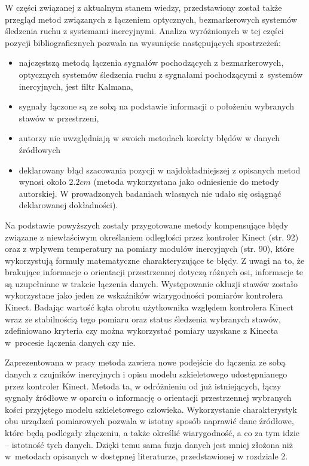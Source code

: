 \documentclass[10pt,a4paper]{article}
\begin{document}
W części związanej z aktualnym stanem wiedzy, przedstawiony został także przegląd metod związanych z łączeniem optycznych, bezmarkerowych systemów śledzenia ruchu z systemami inercyjnymi. Analiza wyróżnionych w tej części pozycji bibliograficznych pozwala na wysunięcie następujących spostrzeżeń:

\begin{itemize}
\item najczęstszą metodą łączenia sygnałów pochodzących z bezmarkerowych, optycznych systemów śledzenia ruchu z sygnałami pochodzącymi z~systemów inercyjnych, jest filtr Kalmana,
\item sygnały łączone są ze sobą na podstawie informacji o położeniu wybranych stawów w przestrzeni,
\item autorzy nie uwzględniają w swoich metodach korekty błędów w danych źródłowych
\item deklarowany błąd szacowania pozycji w najdokładniejszej z opisanych metod wynosi około $2.2cm$ (metoda wykorzystana jako odniesienie do metody autorskiej. W prowadzonych badaniach własnych nie udało się osiągnąć deklarowanej dokładności).
\end{itemize}

Na podstawie powyższych zostały przygotowane metody kompensujące błędy związane z niewłaściwym określaniem odległości przez kontroler Kinect (str. 92) oraz z wpływem temperatury na pomiary modułów inercyjnych (str. 90), które wykorzystują formuły matematyczne charakteryzujące te błędy. Z uwagi na to, że brakujące informacje o orientacji przestrzennej dotyczą różnych osi, informacje te są uzupełniane w trakcie łączenia danych. Występowanie okluzji stawów zostało wykorzystane jako jeden ze wskaźników wiarygodności pomiarów kontrolera Kinect. Badając wartość kąta obrotu użytkownika względem kontrolera Kinect wraz ze stabilnością tego pomiaru oraz status śledzenia wybranych stawów, zdefiniowano kryteria czy można wykorzystać pomiary uzyskane z Kinecta w~procesie łączenia danych czy nie.

Zaprezentowana w pracy metoda zawiera nowe podejście do łączenia ze sobą danych z czujników inercyjnych i opisu modelu szkieletowego udostępnianego przez kontroler Kinect. Metoda ta, w odróżnieniu od już istniejących, łączy sygnały źródłowe w oparciu o informację o orientacji przestrzennej wybranych kości przyjętego modelu szkieletowego człowieka. Wykorzystanie charakterystyk obu urządzeń pomiarowych pozwala w istotny sposób naprawić dane źródłowe, które będą podlegały złączeniu, a także określić wiarygodność, a co za tym idzie -- istotność tych danych. Dzięki temu sama fuzja danych jest mniej złożona niż w~metodach opisanych w dostępnej literaturze, przedstawionej w rozdziale 2. 
\end{document}
